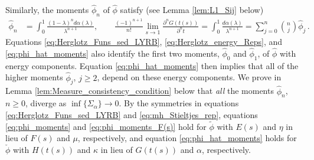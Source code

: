 \documentclass[english,12pt,jmp,graphicx]{revtex4-1}
\newcommand{\ph}{\hat{\phi}}
\begin{document}
Similarly, the moments $\ph_n$ of $\ph$
satisfy (see Lemma \ref{lem:L1_Sij} below)
%
\begin{align}\label{eq:phi_hat_moments}
  \ph_n%
      &=\int_0^1\frac{(1-\lambda)^nd\alpha(\lambda)}{\lambda^{n+1}}, \qquad
      \frac{(-1)^{n+1}}{n!}\lim_{s\to1}\frac{\partial^nG(t(s))}{\partial^nt}
         =\int_0^1\frac{d\alpha(\lambda)}{\lambda^{n+1}}
          =\sum_{j=0}^n{n \choose j} \ph_j\,.
\end{align}
%
Equations
\eqref{eq:Herglotz_Funs_sed_LYRB}, \eqref{eq:Herglotz_energy_Reps},
and \eqref{eq:phi_hat_moments} 
also identify the first two moments, $\ph_0$ and $\ph_1$, of
$\ph$ with energy components. Equation \eqref{eq:phi_hat_moments} then
implies that all of the higher moments $\ph_j$, $j\geq2$, depend on these
energy components. We prove in Lemma
\ref{lem:Measure_consistency_condition} below that \emph{all} the
moments $\ph_n$, $n\geq0$, diverge as
$\inf\{\Sigma_\alpha\}\to0$.
By the symmetries in equations 
\eqref{eq:Herglotz_Funs_sed_LYRB} and \eqref{eq:mh_Stieltjes_rep},
equations \eqref{eq:phi_moments} and \eqref{eq:phi_moments_F(s)} hold for
$\tilde{\phi}$ with $E(s)$ and $\eta$ in lieu of $F(s)$ and $\mu$,
respectively, and equation \eqref{eq:phi_hat_moments} holds for
$\check{\phi}$ with $H(t(s))$ and $\kappa$ in lieu of $G(t(s))$ and $\alpha$,
respectively.
\end{document}
